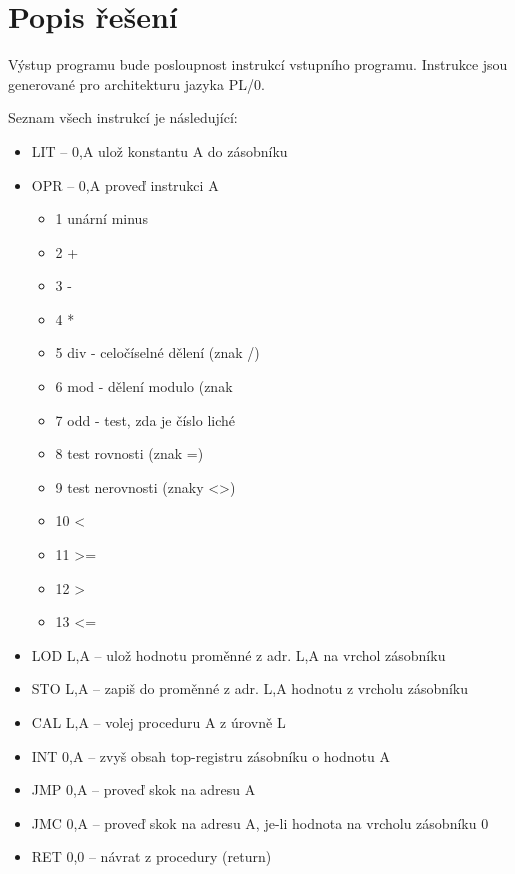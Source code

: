 \documentclass{style}
\begin{document}
\chapter{Popis řešení}
Výstup programu bude posloupnost instrukcí vstupního programu. Instrukce jsou generované pro architekturu jazyka PL/0. 

Seznam všech instrukcí je následující:

\begin{itemize}
\item LIT --  0,A    ulož konstantu A do zásobníku \\
\item OPR -- 0,A    proveď instrukci A \\
\begin{itemize}
\item 1    unární minus \\
\item 2    + \\
\item 3    - \\
\item 4    * \\
\item 5    div - celočíselné dělení (znak /) \\
\item 6    mod - dělení modulo (znak %
\item 7    odd - test, zda je číslo liché \\
\item 8    test rovnosti (znak =) \\
\item 9    test nerovnosti (znaky <>) \\
\item 10    < \\
\item 11    >= \\
\item 12    > \\
\item 13    <= \\
\end{itemize}

\item LOD L,A --    ulož hodnotu proměnné z adr. L,A na vrchol zásobníku \\
\item STO L,A --    zapiš do proměnné z adr. L,A hodnotu z vrcholu zásobníku \\
\item CAL L,A  --  volej proceduru A z úrovně L \\
\item INT 0,A   -- zvyš obsah top-registru zásobníku o hodnotu A \\
\item JMP 0,A   -- proveď skok na adresu A \\
\item JMC 0,A   -- proveď skok na adresu A, je-li hodnota na vrcholu zásobníku 0 \\
\item RET 0,0  --  návrat z procedury (return) \\


\end{itemize}
\end{document}
